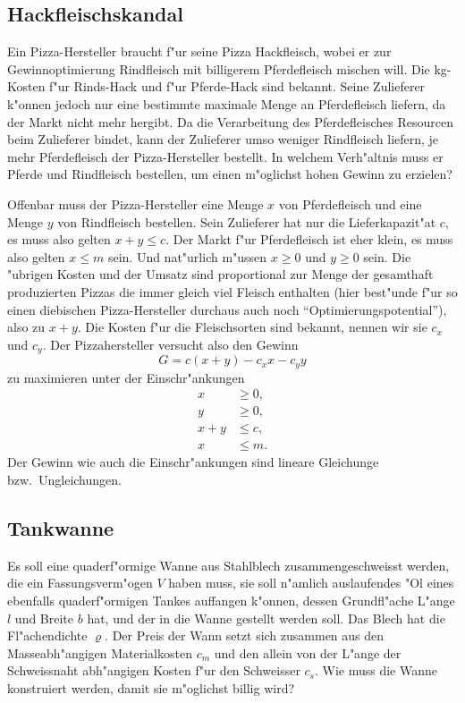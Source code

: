 \subsection{Hackfleischskandal\label{uebersicht:hackfleisch}}
Ein Pizza-Hersteller braucht f"ur seine Pizza Hackfleisch, wobei er
zur Gewinnoptimierung Rindfleisch mit billigerem Pferdefleisch mischen
will. Die kg-Kosten f"ur Rinds-Hack und f"ur Pferde-Hack sind bekannt.
Seine Zulieferer k"onnen jedoch nur eine bestimmte maximale Menge
an Pferdefleisch liefern, da der Markt nicht mehr hergibt.
Da die Verarbeitung des Pferdefleisches Resourcen beim Zulieferer
bindet, kann der Zulieferer umso weniger Rindfleisch liefern, je mehr
Pferdefleisch der Pizza-Hersteller bestellt. In welchem Verh"altnis
muss er Pferde und Rindfleisch bestellen, um einen m"oglichst hohen
Gewinn zu erzielen?

Offenbar muss der Pizza-Hersteller eine Menge $x$ von Pferdefleisch
und eine Menge $y$ von Rindfleisch bestellen. Sein Zulieferer hat
nur die Lieferkapazit"at $c$, es muss also gelten $x+y\le c$.
Der Markt f"ur Pferdefleisch ist eher klein, es muss also gelten
$x\le m$ sein. Und nat"urlich m"ussen $x\ge 0$ und $y\ge 0$ sein.
Die "ubrigen Kosten und der Umsatz sind proportional zur Menge
der gesamthaft produzierten Pizzas die immer gleich viel Fleisch
enthalten (hier best"unde f"ur so einen diebischen Pizza-Hersteller
durchaus auch noch ``Optimierungspotential''), also zu $x+y$. Die
Kosten f"ur die Fleischsorten sind bekannt, nennen wir sie $c_x$ und $c_y$.
Der Pizzahersteller versucht also den Gewinn
\[
G=
c(x+y)-c_xx-c_yy
\]
zu maximieren unter der Einschr"ankungen
\begin{align*}
x&\ge 0,\\y&\ge 0,\\
x+y&\le c,\\
x&\le m.
\end{align*}
Der Gewinn wie auch die Einschr"ankungen sind lineare Gleichunge
bzw.~Ungleichungen.

\subsection{Tankwanne\label{uebersicht:wanne}}
Es soll eine quaderf"ormige Wanne aus Stahlblech zusammengeschweisst
werden, die ein Fassungsverm"ogen $V$ haben muss, sie soll n"amlich
auslaufendes "Ol eines ebenfalls quaderf"ormigen Tankes auffangen k"onnen,
dessen Grundfl"ache L"ange $l$ und Breite $b$ hat, und der in die
Wanne gestellt werden soll.
Das Blech hat die Fl"achendichte $\varrho$. Der Preis der Wann setzt sich
zusammen aus den Masseabh"angigen Materialkosten $c_m$ und den allein
von der L"ange der Schweissnaht abh"angigen Kosten f"ur den Schweisser
$c_s$. Wie muss die Wanne konstruiert werden, damit sie m"oglichst 
billig wird?

